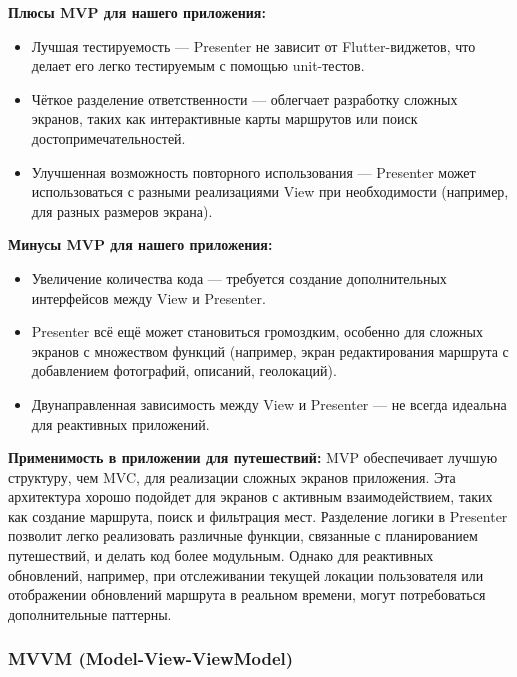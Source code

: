 \textbf{Плюсы MVP для нашего приложения:}
\begin{itemize}
    \item Лучшая тестируемость — Presenter не зависит от Flutter-виджетов, что делает его легко тестируемым с помощью unit-тестов.
    \item Чёткое разделение ответственности — облегчает разработку сложных экранов, таких как интерактивные карты маршрутов или поиск достопримечательностей.
    \item Улучшенная возможность повторного использования — Presenter может использоваться с разными реализациями View при необходимости (например, для разных размеров экрана).
\end{itemize}

\textbf{Минусы MVP для нашего приложения:}
\begin{itemize}
    \item Увеличение количества кода — требуется создание дополнительных интерфейсов между View и Presenter.
    \item Presenter всё ещё может становиться громоздким, особенно для сложных экранов с множеством функций (например, экран редактирования маршрута с добавлением фотографий, описаний, геолокаций).
    \item Двунаправленная зависимость между View и Presenter — не всегда идеальна для реактивных приложений.
\end{itemize}

\textbf{Применимость в приложении для путешествий:}
MVP обеспечивает лучшую структуру, чем MVC, для реализации сложных экранов приложения. Эта архитектура хорошо подойдет для экранов с активным взаимодействием, таких как создание маршрута, поиск и фильтрация мест. Разделение логики в Presenter позволит легко реализовать различные функции, связанные с планированием путешествий, и делать код более модульным. Однако для реактивных обновлений, например, при отслеживании текущей локации пользователя или отображении обновлений маршрута в реальном времени, могут потребоваться дополнительные паттерны.

\subsubsection*{MVVM (Model-View-ViewModel)}



